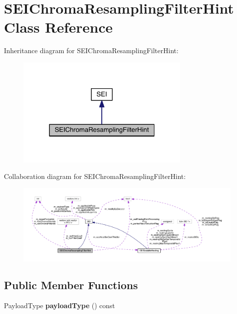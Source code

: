 \hypertarget{class_s_e_i_chroma_resampling_filter_hint}{}\section{S\+E\+I\+Chroma\+Resampling\+Filter\+Hint Class Reference}
\label{class_s_e_i_chroma_resampling_filter_hint}


Inheritance diagram for S\+E\+I\+Chroma\+Resampling\+Filter\+Hint\+:
\nopagebreak
\begin{figure}[H]
\begin{center}
\leavevmode
\includegraphics[width=240pt]{db/d98/class_s_e_i_chroma_resampling_filter_hint__inherit__graph}
\end{center}
\end{figure}


Collaboration diagram for S\+E\+I\+Chroma\+Resampling\+Filter\+Hint\+:
\nopagebreak
\begin{figure}[H]
\begin{center}
\leavevmode
\includegraphics[width=350pt]{dc/d93/class_s_e_i_chroma_resampling_filter_hint__coll__graph}
\end{center}
\end{figure}
\subsection*{Public Member Functions}
\begin{DoxyCompactItemize}
\item 
\mbox{\label{class_s_e_i_chroma_resampling_filter_hint_a55cfa06082c80b11691408267a9f7993}} 
Payload\+Type {\bfseries payload\+Type} () const
\end{DoxyCompactItemize}
